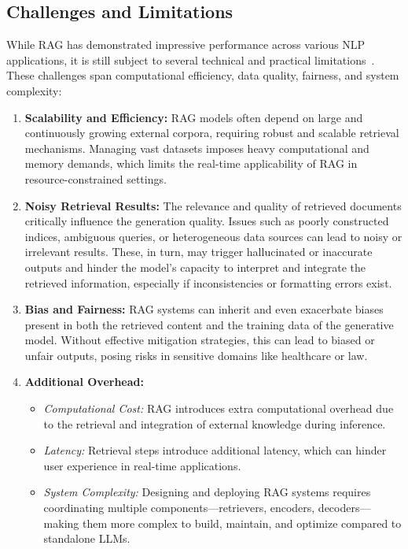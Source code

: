 \subsection{Challenges and Limitations}
While RAG has demonstrated impressive performance across various NLP applications, it is still subject to several technical and practical limitations~\citep{zhao2024retrieval, gupta2024comprehensive}. These challenges span computational efficiency, data quality, fairness, and system complexity:

\begin{enumerate}
	\item \textbf{Scalability and Efficiency:} RAG models often depend on large and continuously growing external corpora, requiring robust and scalable retrieval mechanisms. Managing vast datasets imposes heavy computational and memory demands, which limits the real-time applicability of RAG in resource-constrained settings.
	
	\item \textbf{Noisy Retrieval Results:} The relevance and quality of retrieved documents critically influence the generation quality. Issues such as poorly constructed indices, ambiguous queries, or heterogeneous data sources can lead to noisy or irrelevant results. These, in turn, may trigger hallucinated or inaccurate outputs and hinder the model's capacity to interpret and integrate the retrieved information, especially if inconsistencies or formatting errors exist.
	
	\item \textbf{Bias and Fairness:} RAG systems can inherit and even exacerbate biases present in both the retrieved content and the training data of the generative model. Without effective mitigation strategies, this can lead to biased or unfair outputs, posing risks in sensitive domains like healthcare or law.
	
	\item \textbf{Additional Overhead:}
	\begin{itemize}
		\item \textit{Computational Cost:} RAG introduces extra computational overhead due to the retrieval and integration of external knowledge during inference.
		\item \textit{Latency:} Retrieval steps introduce additional latency, which can hinder user experience in real-time applications.
		\item \textit{System Complexity:} Designing and deploying RAG systems requires coordinating multiple components—retrievers, encoders, decoders—making them more complex to build, maintain, and optimize compared to standalone LLMs.
		

\end{itemize}
\end{enumerate}
